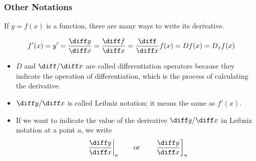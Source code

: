 \begin{frame}
\frametitle{Other Notations}
If $y = f(x)$ is a function, there are many ways to write its derivative.

\[
f'(x) = y' = \frac{\diff y}{\diff x} = \frac{\diff f}{\diff x} = \frac{\diff}{\diff x} f(x) = Df(x) = D_x f(x)
\]
\begin{itemize}
\item  $D$ and $\diff/\diff x$ are called differentiation operators because they indicate the operation of differentiation, which is the process of calculating the derivative.

\item  $\diff y/\diff x$ is called Leibniz notation; it means the same as $f'(x)$.  

\item  If we want to indicate the value of the derivative $\diff y/\diff x$ in Leibniz notation at a point $a$, we write
\[
\left. \frac{\diff y}{\diff x}\right|_a \qquad \textrm{or}\qquad \left. \frac{\diff y}{\diff x}\right]_a
\]
\end{itemize}
\end{frame}
